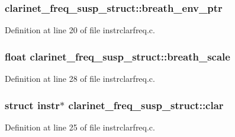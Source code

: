 \subsubsection[{\texorpdfstring{breath\+\_\+env\+\_\+ptr}{breath_env_ptr}}]{ clarinet\+\_\+freq\+\_\+susp\+\_\+struct\+::breath\+\_\+env\+\_\+ptr}\hypertarget{structclarinet__freq__susp__struct_a7baeb99ca0f994a3c93808019f80faa3}{}\label{structclarinet__freq__susp__struct_a7baeb99ca0f994a3c93808019f80faa3}


Definition at line 20 of file instrclarfreq.\+c.

\subsubsection[{\texorpdfstring{breath\+\_\+scale}{breath_scale}}]{\setlength{\rightskip}{0pt plus 5cm}float clarinet\+\_\+freq\+\_\+susp\+\_\+struct\+::breath\+\_\+scale}\hypertarget{structclarinet__freq__susp__struct_a6f91d3eba2269ac5791be5c46c4874ff}{}\label{structclarinet__freq__susp__struct_a6f91d3eba2269ac5791be5c46c4874ff}


Definition at line 28 of file instrclarfreq.\+c.

\subsubsection[{\texorpdfstring{clar}{clar}}]{\setlength{\rightskip}{0pt plus 5cm}struct {\bf instr}$\ast$ clarinet\+\_\+freq\+\_\+susp\+\_\+struct\+::clar}\hypertarget{structclarinet__freq__susp__struct_a59c209cae8b70baa99e226058634c3d4}{}\label{structclarinet__freq__susp__struct_a59c209cae8b70baa99e226058634c3d4}


Definition at line 25 of file instrclarfreq.\+c.


